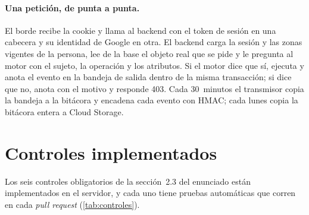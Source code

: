 \documentclass[11pt,a4paper]{article}
\theoremstyle{definition}
\theoremstyle{remark}
\begin{document}
\paragraph{Una petici\'on, de punta a punta.} El borde recibe la cookie y
llama al backend con el token de sesi\'on en una cabecera y su identidad de
Google en otra. El backend carga la sesi\'on y las zonas vigentes de la
persona, lee de la base el objeto real que se pide y le pregunta al motor con
el sujeto, la operaci\'on y los atributos. Si el motor dice que s\'i, ejecuta
y anota el evento en la bandeja de salida dentro de la misma transacci\'on; si
dice que no, anota  con el motivo y responde 403. Cada
30~minutos el transmisor copia la bandeja a la bit\'acora y encadena cada
evento con HMAC; cada lunes copia la bit\'acora entera a Cloud Storage.

%
%
\section{Controles implementados}
\label{sec:controles}

Los seis controles obligatorios de la secci\'on~2.3 del enunciado est\'an
implementados en el servidor, y cada uno tiene pruebas autom\'aticas que corren
en cada \emph{pull request} (\cref{tab:controles}).
\end{document}
